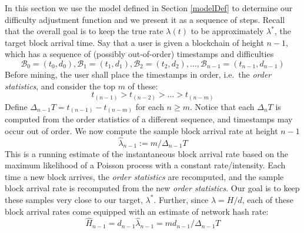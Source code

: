 \documentclass[12pt,english]{mrl}
\theoremstyle{definition}
\renewcommand{\geq}{\geqslant}
\numberwithin{equation}{section}
\numberwithin{figure}{section}
\numberwithin{equation}{section}
\numberwithin{equation}{section}
\numberwithin{figure}{section}
\begin{document}
In this section we use the model defined in Section \ref{modelDef} to determine our difficulty adjustment function and we present it as a sequence of steps. Recall that the overall goal is to keep the true rate $\lambda(t)$ to be approximately $\lambda^{*}$, the target block arrival time. Say that a user is given a blockchain of height $n-1$, which has a sequence of (possibly out-of-order) timestamps and difficulties
\[\mathcal{B}_0 = (t_0, d_0), \mathcal{B}_1 = (t_1, d_1), \mathcal{B}_2 = (t_2, d_2), \ldots, \mathcal{B}_{n-1} = (t_{n-1},d_{n-1})\]
Before mining, the user shall place the timestamps in order, i.e.\ the \emph{order statistics}, and consider the top $m$ of these:
\[t_{(n-1)} > t_{(n-2)} > \ldots > t_{(n-m)}\]
Define $\Delta_{n-1} T = t_{(n-1)} - t_{(n-m)}$ for each $n \geq m$. Notice that each $\Delta_{n} T$ is computed from the order statistics of a different sequence, and timestamps may occur out of order. We now compute the sample block arrival rate at height $n-1$
\[\hat{\lambda}_{n-1} := m/\Delta_{n-1}T\]
This is a running estimate of the instantaneous block arrival rate based on the maximum likelihood of a Poisson process with a constant rate/intensity. Each time a new block arrives, the \emph{order statistics} are recomputed, and the sample block arrival rate is recomputed from the new \emph{order statistics}. Our goal is to keep these samples very close to our target, $\lambda^*$. Further, since $\lambda = H/d$, each of these block arrival rates come equipped with an estimate of network hash rate:
\[\hat{H}_{n-1} = d_{n-1} \hat{\lambda}_{n-1} = m d_{n-1}/\Delta_{n-1} T\]
\end{document}
